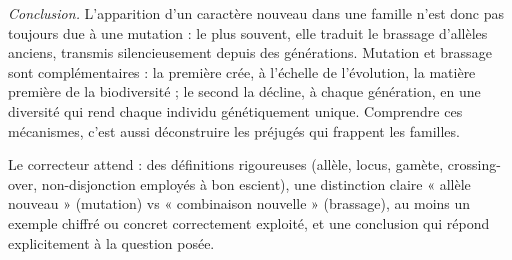 \documentclass[11pt]{article}
\begin{document}
\begin{corrige}
\emph{Conclusion.} L'apparition d'un caractère nouveau dans une famille n'est donc pas toujours due à une mutation : le plus souvent, elle traduit le brassage d'allèles anciens, transmis silencieusement depuis des générations. Mutation et brassage sont complémentaires : la première crée, à l'échelle de l'évolution, la matière première de la biodiversité ; le second la décline, à chaque génération, en une diversité qui rend chaque individu génétiquement unique. Comprendre ces mécanismes, c'est aussi déconstruire les préjugés qui frappent les familles.
\end{corrige}

\begin{attention}
Le correcteur attend : des définitions rigoureuses (allèle, locus, gamète, crossing-over, non-disjonction employés à bon escient), une distinction claire « allèle nouveau » (mutation) vs « combinaison nouvelle » (brassage), au moins un exemple chiffré ou concret correctement exploité, et une conclusion qui répond explicitement à la question posée.
\end{attention}
\end{document}
